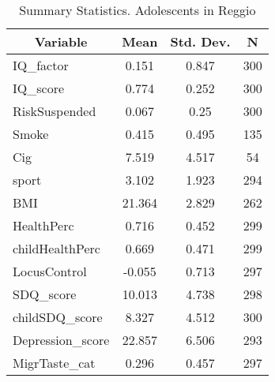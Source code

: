 
\begin{table}[htbp]\centering \caption{Summary Statistics. Adolescents in Reggio \label{cityAdolReggio}}
\begin{tabular}{l c c  c}\hline\hline
\multicolumn{1}{c}{\textbf{Variable}} & \textbf{Mean}
 & \textbf{Std. Dev.} & \textbf{N}\\ \hline
IQ\_factor & 0.151 & 0.847  & 300\\
IQ\_score & 0.774 & 0.252  & 300\\
RiskSuspended & 0.067 & 0.25  & 300\\
Smoke & 0.415 & 0.495  & 135\\
Cig & 7.519 & 4.517  & 54\\
sport & 3.102 & 1.923  & 294\\
BMI & 21.364 & 2.829  & 262\\
HealthPerc & 0.716 & 0.452  & 299\\
childHealthPerc & 0.669 & 0.471  & 299\\
LocusControl & -0.055 & 0.713  & 297\\
SDQ\_score & 10.013 & 4.738  & 298\\
childSDQ\_score & 8.327 & 4.512  & 300\\
Depression\_score & 22.857 & 6.506  & 293\\
MigrTaste\_cat & 0.296 & 0.457  & 297\\
\hline\end{tabular}
\end{table}
